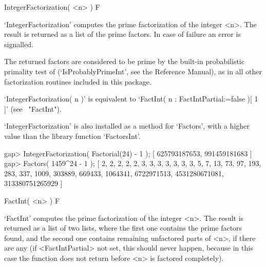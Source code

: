 



\>IntegerFactorization( <n> ) F

`IntegerFactorization' computes the prime factorization of the
integer <n>. The result is returned as a list of the prime factors.
In case of failure an error is signalled.

The returned factors are considered to be prime by the built-in
probabilistic primality test of {\GAP} 
(`IsProbablyPrimeInt', see the Reference Manual),
as in all other factorization routines included in this package.

`IntegerFactorization( n )' is equivalent to
`FactInt( n : FactIntPartial:=false )[ 1 ]'
(see ~"FactInt").

`IntegerFactorization' is also installed as a method for `Factors',
with a higher value than the {\GAP} library function `FactorsInt'.

\beginexample
gap> IntegerFactorization( Factorial(24) - 1 );
[ 625793187653, 991459181683 ]
\endexample
\beginexample
gap> Factors( 1459^24 - 1 );
[ 2, 2, 2, 2, 2, 3, 3, 3, 3, 3, 3, 3, 5, 7, 13, 73, 97, 193, 283, 337, 1009, 
  303889, 669433, 1064341, 6722971513, 4531280671081, 313380751265929 ]
\endexample



\>FactInt( <n> ) F

`FactInt' computes the prime factorization of the integer <n>.
The result is returned as a list of two lists, where the first one 
contains the prime factors found, and the second one contains
remaining 
unfactored parts of <n>,
if there are any (if <FactIntPartial> not set,
this should never happen, because in this case the
function does not return before <n> is factored completely).

